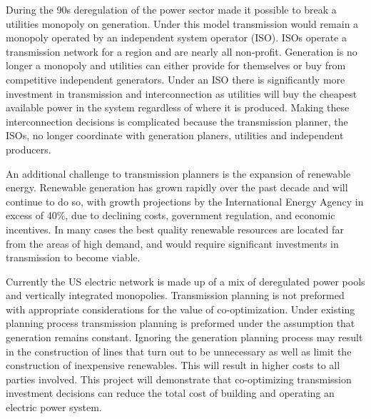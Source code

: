 \documentclass[oneside,12pt]{report}
\begin{document}
During the 90s deregulation of the power sector made it possible to break a utilities monopoly on generation. Under this model transmission would remain a monopoly operated by an independent system operator (ISO). ISOs operate a transmission network for a region and are nearly all non-profit. Generation is no longer a monopoly and utilities can either provide for themselves or buy from competitive independent generators. Under an ISO there is significantly more investment in transmission and interconnection as utilities will buy the cheapest available power in the system regardless of where it is produced. Making these interconnection decisions is complicated because the transmission planner, the ISOs, no longer coordinate with generation planers, utilities and independent producers.

An additional challenge to transmission planners is the expansion of renewable energy. Renewable generation has grown rapidly over the past decade and will continue to do so, with growth projections by the International Energy Agency in excess of 40\%, due to declining costs, government regulation, and economic incentives. \cite{IEA} In many cases the best quality renewable resources are located far from the areas of high demand, and would require significant investments in transmission to become viable. 

Currently the US electric network is made up of a mix of deregulated power pools and vertically integrated monopolies. Transmission planning is not preformed with appropriate considerations for the value of co-optimization. Under existing planning process transmission planning is preformed under the assumption that generation remains constant. Ignoring the generation planning process may result in the construction of lines that turn out to be unnecessary as well as limit the construction of inexpensive renewables. This will result in higher costs to all parties involved. This project will demonstrate that co-optimizing transmission investment decisions can reduce the total cost of building and operating an electric power system.
\end{document}
